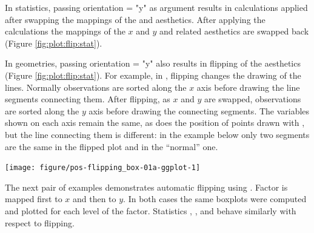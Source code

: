 \documentclass[krantz2]{krantz}\usepackage{knitr}
\begin{document}
In statistics, passing {orientation = "y"} as argument results in calculations applied after swapping the mappings of the  and  aesthetics. After applying the calculations the mappings of the $x$ and $y$ and related aesthetics are swapped back (Figure \ref{fig:plot:flip:stat}).

In geometries, passing {orientation = "y"} also results in flipping of the aesthetics  (Figure \ref{fig:plot:flip:stat}). For example, in , flipping changes the drawing of the lines. Normally observations are sorted along the $x$ axis before drawing the line segments connecting them. After flipping, as $x$ and $y$ are swapped, observations are sorted along the $y$ axis before drawing the connecting segments. The variables shown on each axis remain the same, as does the position of points drawn with , but the line connecting them is different: in the example below only two segments are the same in the flipped plot and in the ``normal'' one.



\begin{knitrout}\footnotesize
{}\color{fgcolor}\begin{kframe}
\begin{alltt}
 \hlkwb{<-}
   \hlstd{(} \hlstd{= mtcars[}\hlopt{:}\hlstd{, ],}
        \hlstd{=} \hlstd{(}    \hlopt{+}
    \hlstd{()}
 \hlkwb{<-}  \hlopt{+} \hlstd{()} \hlopt{+} \hlstd{(}\hlstd{)}
 \hlkwb{<-}  \hlopt{+} \hlstd{(} \hlstd{=} \hlstd{)} \hlopt{+} \hlstd{(}\hlstd{)}
 \hlopt{+} 
\end{alltt}
\end{kframe}

{\centering \texttt{[image: figure/pos-flipping\_box-01a-ggplot-1]} 

}


\end{knitrout}

The next pair of examples demonstrates automatic flipping using . Factor  is mapped first to $x$ and then to $y$. In both cases the same boxplots were computed and plotted for each level of the factor. Statistics , ,  and  behave similarly with respect to flipping.
\end{document}
